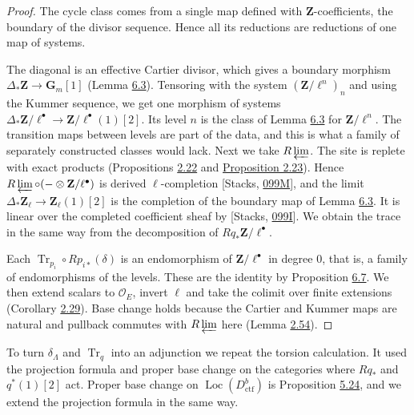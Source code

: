 \documentclass[11pt]{article}
\providecommand{\Loc}{}\renewcommand{\Loc}{\operatorname{Loc}}
\begin{document}
\begin{proof}[{Proof}]\label{bp582}%
The cycle class comes from a single map defined with \(\mathbf Z\)-coefficients, the boundary of the divisor sequence. Hence all its reductions are reductions of one map of systems.

The diagonal is an effective Cartier divisor, which gives a boundary morphism \(\Delta_*\mathbf Z\to\mathbf G_m[1]\) (Lemma \hyperref[bp523]{6.3}). Tensoring with the system \((\mathbf Z/\ell^n)_n\) and using the Kummer sequence, we get one morphism of systems \(\Delta_*\mathbf Z/\ell^\bullet\to\mathbf Z/\ell^\bullet(1)[2]\). Its level \(n\) is the class of Lemma \hyperref[bp523]{6.3} for \(\mathbf Z/\ell^n\). The transition maps between levels are part of the data, and this is what a family of separately constructed classes would lack. Next we take \(R\varprojlim\). The site is replete with exact products (Propositions \hyperref[bp65]{2.22} and \hyperref[bp68]{Proposition 2.23}). Hence \(R\varprojlim\circ(-\otimes\mathbf Z/\ell^\bullet)\) is derived \(\ell\)-completion [Stacks, \href{https://stacks.math.columbia.edu/tag/099M}{099M}], and the limit \(\Delta_*\mathbf Z_\ell\to\mathbf Z_\ell(1)[2]\) is the completion of the boundary map of Lemma \hyperref[bp523]{6.3}. It is linear over the completed coefficient sheaf by [Stacks, \href{https://stacks.math.columbia.edu/tag/099I}{099I}]. We obtain the trace in the same way from the decomposition of \(Rq_*\mathbf Z/\ell^\bullet\).

Each \(\operatorname{Tr}_{p_i}\circ Rp_{i*}(\delta)\) is an endomorphism of \(\mathbf Z/\ell^\bullet\) in degree \(0\), that is, a family of endomorphisms of the levels. These are the identity by Proposition \hyperref[bp534]{6.7}. We then extend scalars to \(\mathcal O_E\), invert \(\ell\) and take the colimit over finite extensions (Corollary \hyperref[bp86]{2.29}). Base change holds because the Cartier and Kummer maps are natural and pullback commutes with \(R\varprojlim\) here (Lemma \hyperref[bp167]{2.54}).
\end{proof}

\label{bp583}%
To turn \(\delta_\Lambda\) and \(\operatorname{Tr}_q\) into an adjunction we repeat the torsion calculation. It used the projection formula and proper base change on the categories where \(Rq_*\) and \(q^*(1)[2]\) act. Proper base change on \(\Loc(D^b_{\mathrm{ctf}})\) is Proposition \hyperref[bp488]{5.24}, and we extend the projection formula in the same way.
\end{document}
